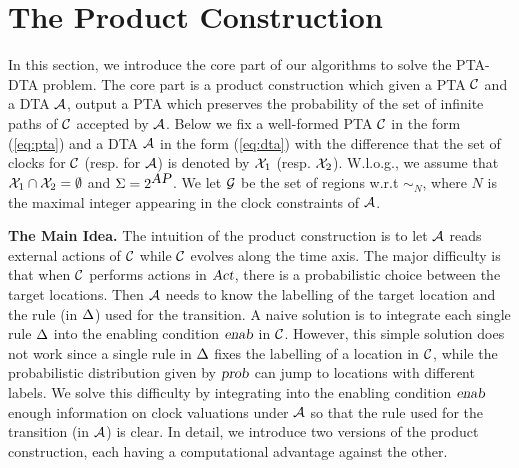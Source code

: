 \vspace{-0.8em}
\section{The Product Construction}
\vspace{-0.8em}
In this section, we introduce the core part of our algorithms to solve the {\sc PTA-DTA} problem. The core part is a product construction which given a PTA $\mathcal{C}$ and a DTA $\mathcal{A}$, output a PTA which preserves the probability of the set of infinite paths of $\mathcal{C}$ accepted by $\mathcal{A}$.
Below we fix a well-formed PTA $\mathcal{C}$ in the form (\ref{eq:pta}) and a DTA $\mathcal{A}$ in the form (\ref{eq:dta}) 
with the difference that the set of clocks for $\mathcal{C}$ (resp. for $\mathcal{A}$) is denoted by $\mathcal{X}_1$ (resp. $\mathcal{X}_2$).
W.l.o.g., we assume that $\mathcal{X}_1\cap\mathcal{X}_2=\emptyset$ and $\Sigma=2^{\mbox{\sl AP}}$.
We let $\mathcal{G}$ be the set of regions w.r.t $\sim_N$, where $N$ is the maximal integer appearing in the clock constraints of $\mathcal{A}$.

{\bf The Main Idea.} The intuition of the product construction is to let $\mathcal{A}$ reads external actions of $\mathcal{C}$ while $\mathcal{C}$ evolves along the time axis.
The major difficulty is that when $\mathcal{C}$ performs actions in $\mbox{\sl Act}$, there is a probabilistic choice between the target locations. Then $\mathcal{A}$ needs to know the labelling of the target location and the rule (in $\Delta$) used for the transition.
A naive solution is to integrate each single rule $\Delta$ into the enabling condition $\mbox{\sl enab}$ in $\mathcal{C}$. However, this simple solution does not work since a single rule in $\Delta$ fixes the labelling of a location in $\mathcal{C}$, while the probabilistic distribution given by $\mbox{\sl prob}$ can jump to locations with different labels.
We solve this difficulty by integrating into the enabling condition $\mbox{\sl enab}$ enough information on clock valuations under $\mathcal{A}$ so that the rule  used for the transition (in $\mathcal{A}$) is clear.
In detail, we introduce two versions of the product construction, each having a computational advantage against the other.






